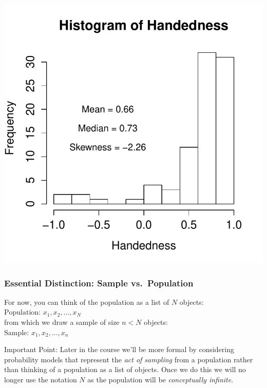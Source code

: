 \documentclass[handout]{beamer}
\begin{document}


\begin{frame}
\centering \includegraphics[scale = 0.75]{./images/handedness_skew}


\end{frame}
\begin{frame}
\frametitle{Essential Distinction: Sample vs.\ Population}
For now, you can think of the population as a list of $N$ objects:\\
	\alert{$\mbox{Population: }x_1, x_2, \hdots, x_N$}\\
from which we draw a sample of size $n<N$ objects:\\
	\alert{$\mbox{Sample: } x_1, x_2, \hdots, x_n$}
\pause
\vspace{3em}
\begin{alertblock}{Important Point:}
Later in the course we'll be more formal by considering \alert{probability models} that represent the \alert{\emph{act of sampling}} from a population rather than thinking of a population as a list of objects. Once we do this we will no longer use the notation $N$ as the population will be \alert{\emph{conceptually infinite}}.
\end{alertblock}
\end{frame}
\end{document}
